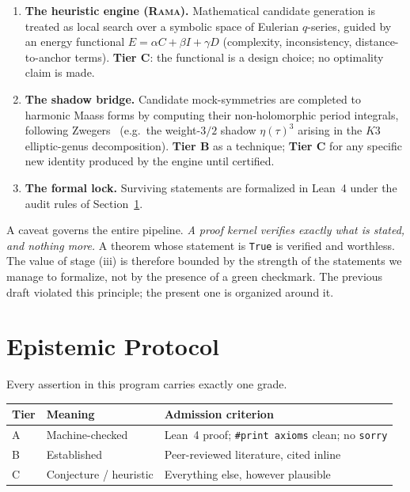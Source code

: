 \documentclass[11pt,a4paper]{article}
\theoremstyle{plain}
\theoremstyle{definition}
\theoremstyle{remark}
\newcommand{\tierB}{\textbf{Tier B}}
\newcommand{\tierC}{\textbf{Tier C}}
\begin{document}
\begin{enumerate}
\item \textbf{The heuristic engine (\textsc{Rama}).} Mathematical candidate
generation is treated as local search over a symbolic space of Eulerian
$q$-series, guided by an energy functional
$E=\alpha C+\beta I+\gamma D$ (complexity, inconsistency, distance-to-anchor
terms). \tierC{}: the functional is a design choice; no optimality claim is
made.
\item \textbf{The shadow bridge.} Candidate mock-symmetries are completed to
harmonic Maass forms by computing their non-holomorphic period integrals,
following Zwegers~\cite{Zwegers2002} (e.g.\ the weight-$3/2$ shadow
$\eta(\tau)^{3}$ arising in the $K3$ elliptic-genus decomposition). \tierB{}
as a technique; \tierC{} for any specific new identity produced by the
engine until certified.
\item \textbf{The formal lock.} Surviving statements are formalized in
Lean~4 under the audit rules of Section~\ref{sec:protocol}.
\end{enumerate}

A caveat governs the entire pipeline. \emph{A proof kernel verifies exactly
what is stated, and nothing more.} A theorem whose statement is \texttt{True}
is verified and worthless. The value of stage (iii) is therefore bounded by
the strength of the statements we manage to formalize, not by the presence
of a green checkmark. The previous draft violated this principle; the
present one is organized around it.

\section{Epistemic Protocol}\label{sec:protocol}

Every assertion in this program carries exactly one grade.

\begin{center}
\begin{tabular}{@{}lll@{}}
\toprule
Tier & Meaning & Admission criterion \\
\midrule
A & Machine-checked & Lean~4 proof; \texttt{\#print axioms} clean; no \texttt{sorry} \\
B & Established & Peer-reviewed literature, cited inline \\
C & Conjecture / heuristic & Everything else, however plausible \\
\bottomrule
\end{tabular}
\end{center}
\end{document}
